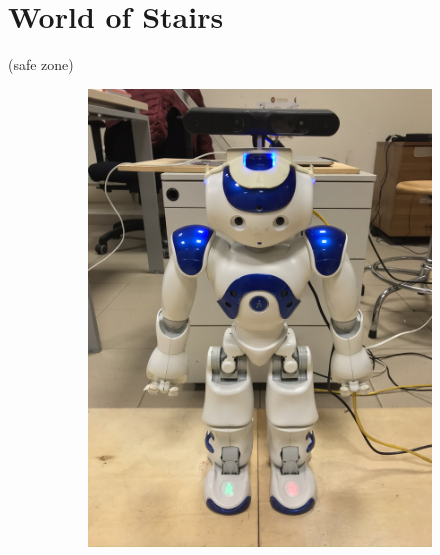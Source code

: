 \section{World of Stairs}
(safe zone)
\begin{figure}
  \begin{subfigure}[b]{0.49\textwidth}
    \includegraphics[width=\textwidth]{figures/NAO-with-xtion.JPEG}
    \caption{}
    \label{fig:nao-with-xtion}
  \end{subfigure}
  \hfill
  \begin{subfigure}[b]{0.49\textwidth}

\end{subfigure}
\end{figure}
